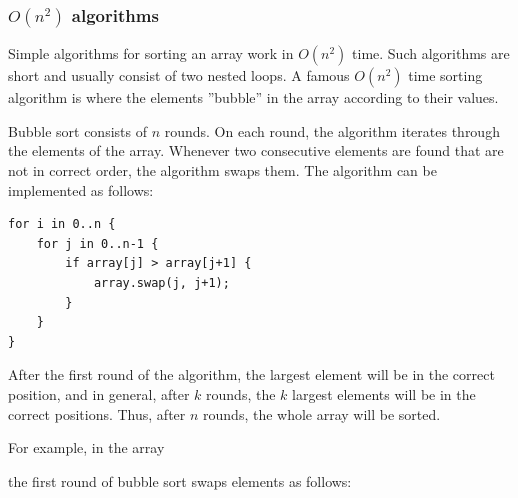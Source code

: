 \subsubsection{$O(n^2)$ algorithms}


Simple algorithms for sorting an array
work in $O(n^2)$ time.
Such algorithms are short and usually
consist of two nested loops.
A famous $O(n^2)$ time sorting algorithm
is  where the elements
''bubble'' in the array according to their values.

Bubble sort consists of $n$ rounds.
On each round, the algorithm iterates through
the elements of the array.
Whenever two consecutive elements are found
that are not in correct order,
the algorithm swaps them.
The algorithm can be implemented as follows:
\begin{lstlisting}
for i in 0..n {
    for j in 0..n-1 {
        if array[j] > array[j+1] {
            array.swap(j, j+1);
        }
    }
}
\end{lstlisting}

After the first round of the algorithm,
the largest element will be in the correct position,
and in general, after $k$ rounds, the $k$ largest
elements will be in the correct positions.
Thus, after $n$ rounds, the whole array
will be sorted.

For example, in the array

\begin{center}
\end{center}

\noindent
the first round of bubble sort swaps elements
as follows:

\begin{center}
\end{center}

